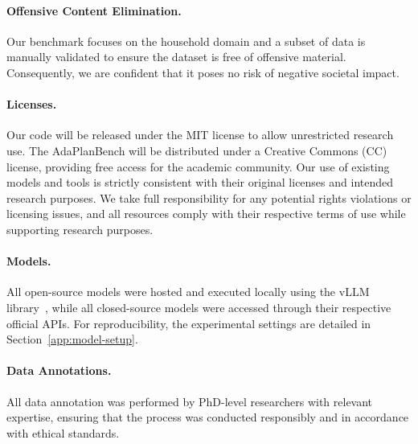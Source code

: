 \documentclass{article} %
\newcommand{\bench}[1]{AdaPlanBench}
\begin{document}
\paragraph{Offensive Content Elimination.} 
Our benchmark focuses on the household domain and a subset of data is manually validated to ensure the dataset is free of offensive material. Consequently, we are confident that it poses no risk of negative societal impact.

\paragraph{Licenses.} 
Our code will be released under the MIT license to allow unrestricted research use. The \bench{} will be distributed under a Creative Commons (CC) license, providing free access for the academic community. Our use of existing models and tools is strictly consistent with their original licenses and intended research purposes. We take full responsibility for any potential rights violations or licensing issues, and all resources comply with their respective terms of use while supporting research purposes.

\paragraph{Models.} 
All open-source models were hosted and executed locally using the vLLM library~\citep{vllm}, while all closed-source models were accessed through their respective official APIs. 
For reproducibility, the experimental settings are detailed in Section~\ref{app:model-setup}.


\paragraph{Data Annotations.}

All data annotation was performed by PhD-level researchers with relevant expertise, ensuring that the process was conducted responsibly and in accordance with ethical standards.






\end{document}
